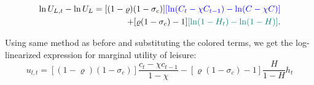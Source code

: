 \documentclass[]{article}
\begin{document}
\begin{equation*}
	\begin{split}
		\ln U_{L,t} - \ln U_{L} = [(1-\varrho)(1-\sigma_c)] {\color{blue}[\ln(C_t-\chi C_{t-1}) -  \ln(C-\chi C)]} \\ 
		+ [\varrho (1-\sigma_c)-1] {\color{teal}[\ln(1-H_t) -  \ln(1-H)]}.
	\end{split}
\end{equation*}

Using same method as before and substituting the colored terms, we get the log-linearized expression for marginal utility of leisure:
\begin{equation*}
	u_{l,t} = [(1-\varrho)(1-\sigma_c)] \frac{c_t -\chi c_{t-1}}{1-\chi}-[\varrho(1-\sigma_c)-1]\frac{H}{1-H}h_t
\end{equation*}
\begin{center}
\end{center}
\end{document}
